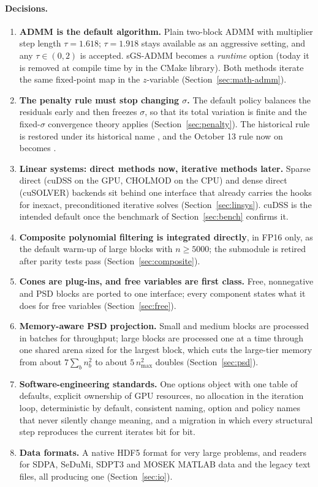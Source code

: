 \documentclass[11pt]{article}
\begin{document}
\paragraph{Decisions.}
\begin{enumerate}[label=\textbf{D\arabic*.}]
  \item \textbf{ADMM is the default algorithm.} Plain two-block ADMM with multiplier step length
  $\tau = 1.618$; $\tau = 1.918$ stays available as an aggressive setting, and any $\tau\in(0,2)$ is
  accepted. sGS-ADMM becomes a \emph{runtime} option (today it is removed at compile time by
   in the CMake library). Both methods iterate the same fixed-point map in the
  $z$-variable \cite{afterimage} (Section~\ref{sec:math-admm}).
  \item \textbf{The penalty rule must stop changing $\sigma$.} The default policy balances the residuals
  early and then freezes $\sigma$, so that its total variation is finite and the fixed-$\sigma$ convergence
  theory applies (Section~\ref{sec:penalty}). The historical rule is restored under its historical name
  , and the October 13 rule now on  becomes .
  \item \textbf{Linear systems: direct methods now, iterative methods later.} Sparse direct (cuDSS on the
  GPU, CHOLMOD on the CPU) and dense direct (cuSOLVER) backends sit behind one interface that already
  carries the hooks for inexact, preconditioned iterative solves (Section~\ref{sec:linsys}). cuDSS is the
  intended default once the benchmark of Section~\ref{sec:bench} confirms it.
  \item \textbf{Composite polynomial filtering is integrated directly}, in FP16 only, as the default warm-up
  of large blocks with $n\ge5000$; the  submodule is retired after parity tests pass
  (Section~\ref{sec:composite}).
  \item \textbf{Cones are plug-ins, and free variables are first class.} Free, nonnegative and PSD blocks
  are ported to one  interface; every component states what it does for free variables
  (Section~\ref{sec:free}).
  \item \textbf{Memory-aware PSD projection.} Small and medium blocks are processed in batches for
  throughput; large blocks are processed one at a time through one shared arena sized for the largest
  block, which cuts the large-tier memory from about $7\sum_b n_b^2$ to about $5\,n_{\max}^2$ doubles
  (Section~\ref{sec:psd}).
  \item \textbf{Software-engineering standards.} One options object with one table of defaults, explicit
  ownership of GPU resources, no allocation in the iteration loop, deterministic by default, consistent
  naming, option and policy names that never silently change meaning, and a migration in which every
  structural step reproduces the current iterates bit for bit.
  \item \textbf{Data formats.} A native HDF5 format for very large problems, and readers for SDPA, SeDuMi,
  SDPT3 and MOSEK MATLAB data and the legacy text files, all producing one 
  (Section~\ref{sec:io}).
\end{enumerate}
\end{document}
